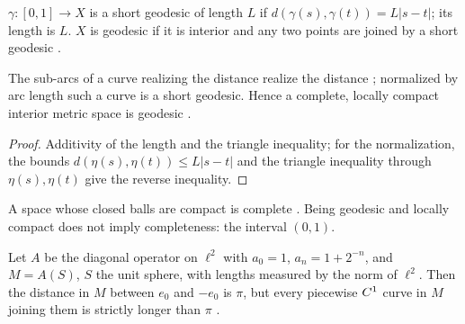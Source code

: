 \begin{definition}
  \label{def:ms-geodesic}
  \leanok
  $\gamma \colon [0, 1] \to X$ is a short geodesic of length $L$ if
  $d(\gamma(s), \gamma(t)) = L |s - t|$; its length is $L$. $X$ is geodesic if it is interior and
  any two points are joined by a short geodesic \cite[Def.~8.1.11]{Lar22}.
\end{definition}

\begin{proposition}
  \label{prop:ms-subarcs}
  \leanok
  The sub-arcs of a curve realizing the distance realize the distance \cite[Obs.~8.1.13]{Lar22};
  normalized by arc length such a curve is a short geodesic. Hence a complete, locally compact
  interior metric space is geodesic \cite[Teorema~8.2.3]{Lar22}.
\end{proposition}

\begin{proof}
  \leanok
  Additivity of the length and the triangle inequality; for the normalization, the bounds
  $d(\eta(s), \eta(t)) \leq L|s - t|$ and the triangle inequality through $\eta(s), \eta(t)$ give the
  reverse inequality.
\end{proof}

\begin{remark}
  \label{rem:ms-proper}
  \leanok
  A space whose closed balls are compact is complete \cite[Obs.~8.2.4]{Lar22}. Being geodesic and
  locally compact does not imply completeness: the interval $(0, 1)$.
\end{remark}

\begin{example}
  \label{ex:ms-mcalpin}
  \leanok
  Let $A$ be the diagonal operator on $\ell^2$ with $a_0 = 1$, $a_n = 1 + 2^{-n}$, and
  $M = A(S)$, $S$ the unit sphere, with lengths measured by the norm of $\ell^2$. Then the distance
  in $M$ between $e_0$ and $-e_0$ is $\pi$, but every piecewise $C^{1}$ curve in $M$ joining them
  is strictly longer than $\pi$ \cite[Ejemplo~10.4.2]{Lar22}.
\end{example}

